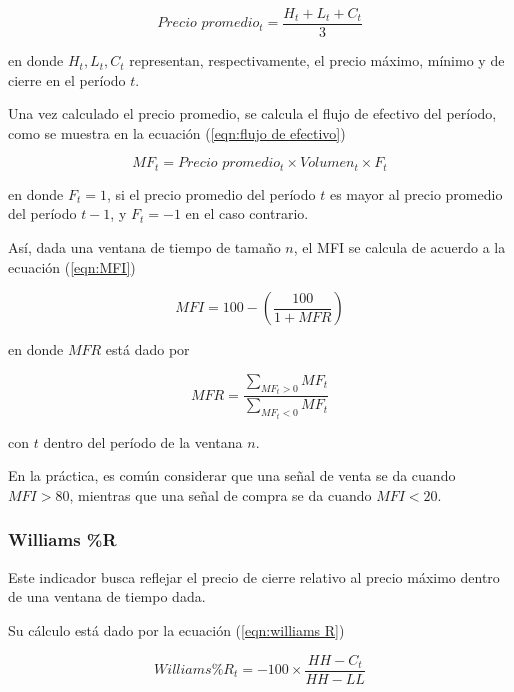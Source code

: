 \documentclass[12pt]{report}
\theoremstyle{break}
\theoremstyle{break}
\begin{document}
\begin{equation} \label{eqn:precio tipico}
Precio\, \, promedio_t = \dfrac{H_{t} + L_{t} + C_{t}}{3}
\end{equation}

en donde $H_{t}, L_t, C_t$ representan, respectivamente, el precio máximo, mínimo y de cierre en el período $t$.

Una vez calculado el precio promedio, se calcula el flujo de efectivo del período, como se muestra en la ecuación (\ref{eqn:flujo de efectivo})

\begin{equation} \label{eqn:flujo de efectivo}
MF_t = Precio\, \, promedio_t \times Volumen_t \times F_t
\end{equation}

en donde $F_t = 1$, si el precio promedio del período $t$ es mayor al precio promedio del período $t-1$, y $F_t = -1$ en el caso contrario.

Así, dada una ventana de tiempo de tamaño $n$, el MFI se calcula de acuerdo a la ecuación (\ref{eqn:MFI})

\begin{equation} \label{eqn:MFI}
MFI = 100 - \left( \frac{100}{1 + MFR} \right)
\end{equation}

en donde $MFR$ está dado por 

\begin{equation} \label{eqn:MFR}
MFR = \dfrac{\sum_{MF_t > 0} MF_t  }{\sum_{MF_t < 0} MF_t}
\end{equation}

con $t$ dentro del período de la ventana $n$.

En la práctica, es común considerar que una señal de venta se da cuando $MFI > 80$, mientras que una señal de compra se da cuando $MFI < 20$.

\subsubsection{Williams \%R}
\label{subsubseccion:Williams R}
Este indicador busca reflejar el precio de cierre relativo al precio máximo dentro de una ventana de tiempo dada.

Su cálculo está dado por la ecuación (\ref{eqn:williams R})

\begin{equation} \label{eqn:williams R}
Williams \%R_t = -100 \times \dfrac{HH - C_t}{HH - LL}
\end{equation}
\end{document}
